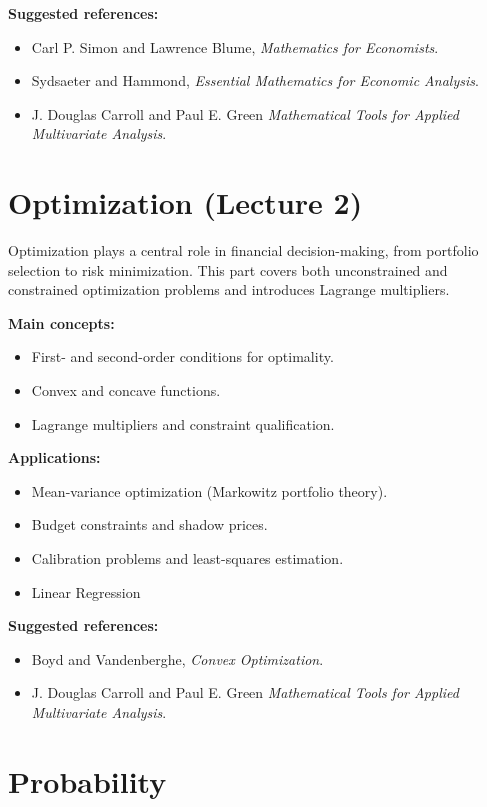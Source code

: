 \documentclass[12pt,a4paper]{article}
\begin{document}
\textbf{Suggested references:}
\begin{itemize}[itemsep=-4pt, topsep=2pt]
    \item Carl P. Simon and Lawrence Blume, \textit{Mathematics for Economists}.
    \item Sydsaeter and Hammond, \textit{Essential Mathematics for Economic Analysis}.
    \item J. Douglas Carroll and Paul E. Green \textit{Mathematical Tools for Applied Multivariate Analysis}.
\end{itemize}


\section{Optimization (Lecture 2)}
Optimization plays a central role in financial decision-making, from portfolio selection to risk minimization. 
This part covers both unconstrained and constrained optimization problems and introduces Lagrange multipliers.

\textbf{Main concepts:}
\begin{itemize}[itemsep=-4pt, topsep=2pt]
    \item First- and second-order conditions for optimality.
    \item Convex and concave functions.
    \item Lagrange multipliers and constraint qualification.
\end{itemize}

\textbf{Applications:}
\begin{itemize}[itemsep=-4pt, topsep=2pt]
    \item Mean-variance optimization (Markowitz portfolio theory).
    \item Budget constraints and shadow prices.
    \item Calibration problems and least-squares estimation.
    \item Linear Regression
\end{itemize}

\textbf{Suggested references:}
\begin{itemize}[itemsep=-4pt, topsep=2pt]
    \item Boyd and Vandenberghe, \textit{Convex Optimization}.
    \item J. Douglas Carroll and Paul E. Green \textit{Mathematical Tools for Applied Multivariate Analysis}.
\end{itemize}


\section{Probability}
\end{document}
